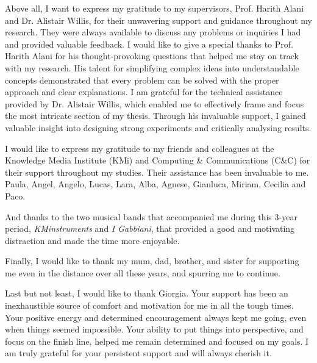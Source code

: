 Above all, I want to express my gratitude to my supervisors, Prof. Harith Alani and Dr. Alistair Willis, for their unwavering support and guidance throughout my research. They were always available to discuss any problems or inquiries I had and provided valuable feedback.
I would like to give a special thanks to Prof. Harith Alani for his thought-provoking questions that helped me stay on track with my research. His talent for simplifying complex ideas into understandable concepts demonstrated that every problem can be solved with the proper approach and clear explanations.
I am grateful for the technical assistance provided by Dr. Alistair Willis, which enabled me to effectively frame and focus the most intricate section of my thesis. Through his invaluable support, I gained valuable insight into designing strong experiments and critically analysing results.


I would like to express my gratitude to my friends and colleagues at the Knowledge Media Institute (KMi) and Computing \& Communications (C\&C) for their support throughout my studies. Their assistance has been invaluable to me. Paula, Angel, Angelo, Lucas, Lara, Alba, Agnese, Gianluca, Miriam, Cecilia and Paco.

And thanks to the two musical bands that accompanied me during this 3-year period, \emph{KMinstruments} and \emph{I Gabbiani}, that provided a good and motivating distraction and made the time more enjoyable. 

Finally, I would like to thank my mum, dad, brother, and sister for supporting me even in the distance over all these years, and spurring me to continue.%

Last but not least, I would like to thank Giorgia.
Your support has been an inexhaustible source of comfort and motivation for me in all the tough times. Your positive energy and determined encouragement always kept me going, even when things seemed impossible. Your ability to put things into perspective, and focus on the finish line, helped me remain determined and focused on my goals. I am truly grateful for your persistent support and will always cherish it.


